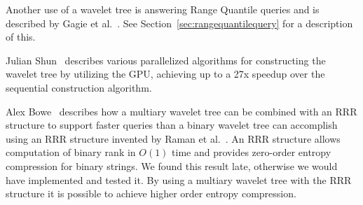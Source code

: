 Another use of a wavelet tree is answering Range Quantile queries and is described by Gagie et al.~.
See Section~\ref{sec:rangequantilequery} for a description of this.

Julian Shun~ describes various parallelized algorithms for constructing the wavelet tree by utilizing the GPU, achieving up to a 27x speedup over the sequential construction algorithm.

Alex Bowe~ describes how a multiary wavelet tree can be combined with an RRR structure to support faster queries than a binary wavelet tree can accomplish using an RRR structure invented by Raman et al.~.
An RRR structure allows computation of binary rank in $O(1)$ time and provides zero-order entropy compression for binary strings.
We found this result late, otherwise we would have implemented and tested it.
By using a multiary wavelet tree with the RRR structure it is possible to achieve higher order entropy compression.




